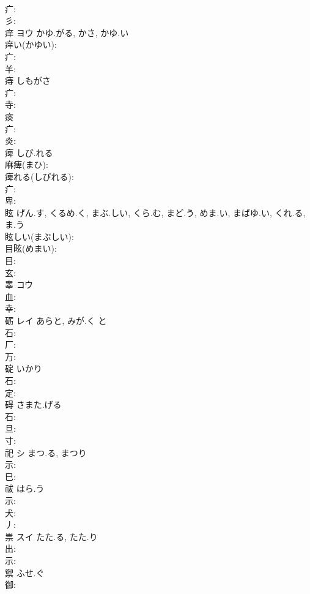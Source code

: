 \documentclass[8pt]{extreport}
\begin{document}
\begin{CJK}{UTF8}{min}
\\	疒: 
\\	彡: 
\\	痒	ヨウ	かゆ.がる, かさ, かゆ.い		
\\	痒い(かゆい): 
\\	疒: 
\\	羊: 
\\	痔		しもがさ			
\\	疒: 
\\	寺: 
\\	痰					
\\	疒: 
\\	炎: 
\\	痺		しび.れる			
\\	麻痺(まひ): 
\\	痺れる(しびれる): 
\\	疒: 
\\	卑: 
\\	眩		げん.す, くるめ.く, まぶ.しい, くら.む, まど.う, めま.い, まばゆ.い, くれ.る, ま.う			
\\	眩しい(まぶしい): 
\\	目眩(めまい): 
\\	目: 
\\	玄: 
\\	睾	コウ			
\\	血: 
\\	幸: 
\\	砺	レイ	あらと, みが.く	と	
\\	石: 
\\	厂: 
\\	万: 
\\	碇		いかり			
\\	石: 
\\	定: 
\\	碍		さまた.げる			
\\	石: 
\\	旦: 
\\	寸: 
\\	祀	シ	まつ.る, まつり		
\\	示: 
\\	巳: 
\\	祓		はら.う			
\\	示: 
\\	犬: 
\\	丿: 
\\	祟	スイ	たた.る, たた.り		
\\	出: 
\\	示: 
\\	禦		ふせ.ぐ			
\\	御: 

\end{CJK}
\end{document}
